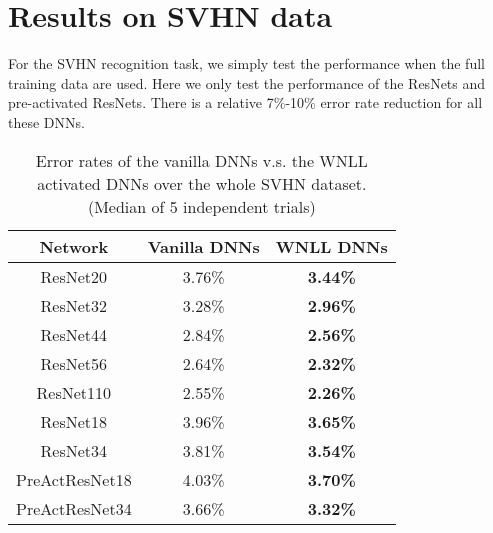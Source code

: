 \documentclass{article}
\begin{document}
\section*{Results on SVHN data}
For the SVHN recognition task, we simply test the performance when the full training data are used. Here we only test the performance of the 
ResNets and pre-activated ResNets. There is a relative 7$\%$-10$\%$ error rate reduction for all these DNNs.

\begin{table}[!h]
\renewcommand{\arraystretch}{1.3}
\centering
\caption{Error rates of the vanilla DNNs v.s. the WNLL activated DNNs over the whole SVHN dataset. (Median of 5 independent trials)}
\label{SVHN-Whole}
\centering
\begin{tabular}{ccc}
\hline
\textbf{Network} & \textbf{Vanilla DNNs} & \textbf{WNLL DNNs}\\
\hline
ResNet20        &  3.76\% & {\bf 3.44\%}\\
ResNet32        &  3.28\% & {\bf 2.96\%}\\
ResNet44        &  2.84\% & {\bf 2.56\%}\\
ResNet56        &  2.64\% & {\bf 2.32\%}\\
ResNet110       &  2.55\% & {\bf 2.26\%}\\
ResNet18 		&  3.96\% & {\bf 3.65\%}\\
ResNet34 		&  3.81\% & {\bf 3.54\%}\\
PreActResNet18 	&  4.03\% & {\bf 3.70\%}\\
PreActResNet34 	&  3.66\% & {\bf 3.32\%}\\
\hline
\end{tabular}
\end{table}
\end{document}
